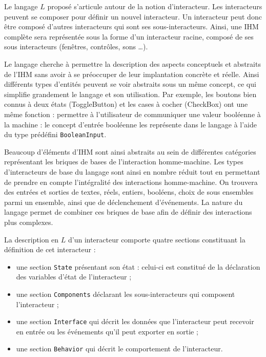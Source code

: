 \documentclass{ihm}
\begin{document}
Le langage $L$  proposé s'articule autour de  la notion d'interacteur.
Les  interacteurs   peuvent  se   composer  pour  définir   un  nouvel
interacteur.   Un   interacteur  peut   donc  être   composé  d'autres
interacteurs qui  sont ses sous-interacteurs. Ainsi,  une IHM complète
sera représentée sous la forme d'un interacteur racine, composé de ses
sous interacteurs (fenêtres, contrôles, sons \ldots). 

Le langage cherche à permettre  la description des aspects conceptuels
et abstraits de l'IHM sans avoir  à se préoccuper de leur implantation
concrète et réelle.  Ainsi différents  types d'entités peuvent se voir
abstraits sous un même concept, ce qui simplifie grandement le langage
et son utilisation. Par exemple, les  boutons bien connus à deux états
(ToggleButton) et les cases à  cocher (CheckBox) ont une même fonction
: permettre à  l'utilisateur de communiquer une valeur  booléenne à la
machine : le concept d'entrée booléenne les représente dans le langage
à l'aide du type prédéfini \lstinline$BooleanInput$.  

Beaucoup d'éléments d'IHM sont ainsi  abstraits au sein de différentes
catégories  représentant   les  briques  de  bases   de  l'interaction
homme-machine. Les types d'interacteurs de  base du langage sont ainsi
en nombre réduit tout en permettant de prendre en compte l'intégralité
des interactions homme-machine. On trouvera  des entrées et sorties de
textes, réels,  entiers, booléens,  choix de  sous ensembles  parmi un
ensemble,  ainsi  que  de  déclenchement d'événements.  La  nature  du
langage permet  de combiner ces  briques de  base afin de  définir des
interactions plus complexes.

La description en $L$ d'un interacteur comporte quatre
sections constituant la définition de cet interacteur :
\begin{itemize}
\item une section \lstinline$State$ présentant son état : celui-ci est
  constitué de la déclaration des variables d'état de l'interacteur ;
\item une section \lstinline$Components$ déclarant les
  sous-interacteurs qui composent l'interacteur ;
\item une section \lstinline$Interface$ qui décrit les données que
  l'interacteur peut recevoir en entrée ou les événements qu'il peut
  exporter en sortie ;
\item une section \lstinline$Behavior$ qui décrit le comportement de
  l'interacteur. 
\end{itemize}
\end{document}
